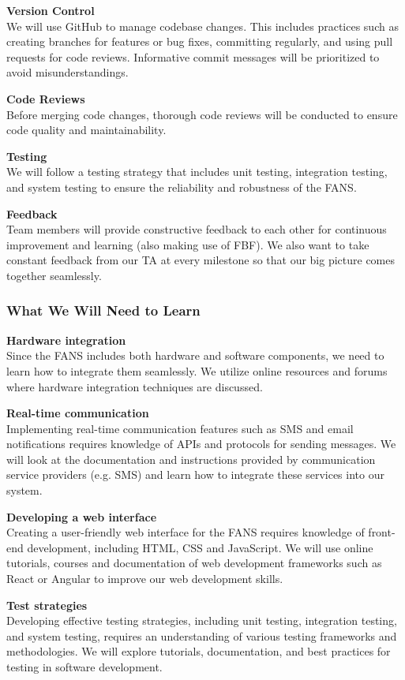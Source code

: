 \textbf{Version Control} \\
We will use GitHub to manage codebase changes. This includes practices such as creating branches for features or bug
fixes, committing regularly, and using pull requests for code reviews. Informative commit messages will be prioritized
to avoid misunderstandings.

\textbf{Code Reviews} \\
Before merging code changes, thorough code reviews will be conducted to ensure code quality and maintainability.

\textbf{Testing} \\
We will follow a testing strategy that includes unit testing, integration testing, and system testing to ensure the
reliability and robustness of the FANS.

\textbf{Feedback} \\
Team members will provide constructive feedback to each other for continuous improvement and learning (also making use
of FBF). We also want to take constant feedback from our TA at every milestone so that our big picture comes together
seamlessly.

\subsubsection{What We Will Need to Learn}

\textbf{Hardware integration} \\
Since the FANS includes both hardware and software components, we need to learn how to integrate them seamlessly. We
utilize online resources and forums where hardware integration techniques are discussed.

\textbf{Real-time communication} \\
Implementing real-time communication features such as SMS and email notifications requires
knowledge of APIs and protocols for sending messages. We will look at the documentation and instructions provided by
communication service providers (e.g. SMS) and learn how to integrate these services into our system.

\textbf{Developing a web interface} \\
Creating a user-friendly web interface for the FANS requires knowledge of front-end development, including HTML, CSS
and JavaScript. We will use online tutorials, courses and documentation of web development frameworks such as React or
Angular to improve our web development skills.

\textbf{Test strategies} \\
Developing effective testing strategies, including unit testing, integration testing, and system
testing, requires an understanding of various testing frameworks and methodologies. We will explore tutorials,
documentation, and best practices for testing in software development.

